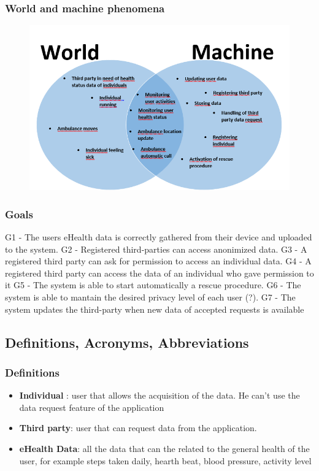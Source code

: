 \documentclass[a4paper,12pt]{article}
\begin{document}
\subsubsection{World and machine phenomena}
\begin{figure}
\centering
\includegraphics[scale=0.75]{phenomena.png}
\end{figure}


\subsubsection{Goals}
G1 - The users eHealth data is  correctly gathered from their device and uploaded to the system.
 \newline
G2 - Registered third-parties can access anonimized data.
 \newline
G3 - A registered third party can ask for permission to access an individual data.
 \newline
G4 - A registered third party can access the data of an individual who gave permission to it
 \newline
G5 - The system is able to start automatically a rescue procedure.
 \newline
G6 - The system is able to mantain the desired privacy level of each user (?).
 \newline
G7 - The system updates the third-party when new data of accepted requests is available
\subsection{Definitions, Acronyms, Abbreviations}
\subsubsection{Definitions}
\begin{itemize}
\item \textbf{Individual} : user that allows the acquisition of the data. He can't use the data request feature of the application
\item \textbf{Third party}: user that can request data from the application.
\item \textbf{eHealth Data}: all the data that can the related to the general health of the user, for example steps taken daily, hearth beat, blood pressure, activity level
\end{itemize}
\end{document}
